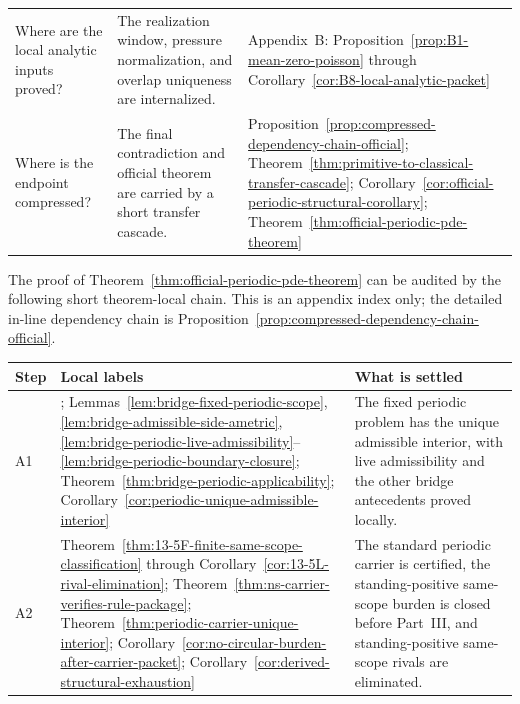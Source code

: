 \begin{center}
\begin{tabularx}{0.98\textwidth}{@{}L{0.24\textwidth}L{0.46\textwidth}Y@{}}
Where are the local analytic inputs proved? & The realization window, pressure normalization, and overlap uniqueness are internalized. & Appendix~B: Proposition~\ref{prop:B1-mean-zero-poisson} through Corollary~\ref{cor:B8-local-analytic-packet}\\
Where is the endpoint compressed? & The final contradiction and official theorem are carried by a short transfer cascade. & Proposition~\ref{prop:compressed-dependency-chain-official}; Theorem~\ref{thm:primitive-to-classical-transfer-cascade}; Corollary~\ref{cor:official-periodic-structural-corollary}; Theorem~\ref{thm:official-periodic-pde-theorem}\\
\bottomrule
\end{tabularx}
\end{center}

\begin{proposition}\label{prop:proof-spine-official-theorem}
The proof of Theorem~\ref{thm:official-periodic-pde-theorem} can be audited by the following short theorem-local chain. This is an appendix index only; the detailed in-line dependency chain is Proposition~\ref{prop:compressed-dependency-chain-official}.
\begin{center}
\small
\renewcommand{\arraystretch}{1.14}
\setlength{\tabcolsep}{4pt}
\begin{tabularx}{0.98\textwidth}{@{}L{0.08\textwidth}L{0.33\textwidth}Y@{}}
\toprule
\textbf{Step} & \textbf{Local labels} & \textbf{What is settled}\\
\midrule
A1 & \StructuralPacketRef{}; Lemmas~\ref{lem:bridge-fixed-periodic-scope}, \ref{lem:bridge-admissible-side-ametric}, \ref{lem:bridge-periodic-live-admissibility}--\ref{lem:bridge-periodic-boundary-closure}; Theorem~\ref{thm:bridge-periodic-applicability}; Corollary~\ref{cor:periodic-unique-admissible-interior} & The fixed periodic problem has the unique admissible interior, with live admissibility and the other bridge antecedents proved locally.\\
A2 & Theorem~\ref{thm:13-5F-finite-same-scope-classification} through Corollary~\ref{cor:13-5L-rival-elimination}; Theorem~\ref{thm:ns-carrier-verifies-rule-package}; Theorem~\ref{thm:periodic-carrier-unique-interior}; Corollary~\ref{cor:no-circular-burden-after-carrier-packet}; Corollary~\ref{cor:derived-structural-exhaustion} & The standard periodic carrier is certified, the standing-positive same-scope burden is closed before Part~III, and standing-positive same-scope rivals are eliminated.\\

\end{tabularx}
\end{center}
\end{proposition}
